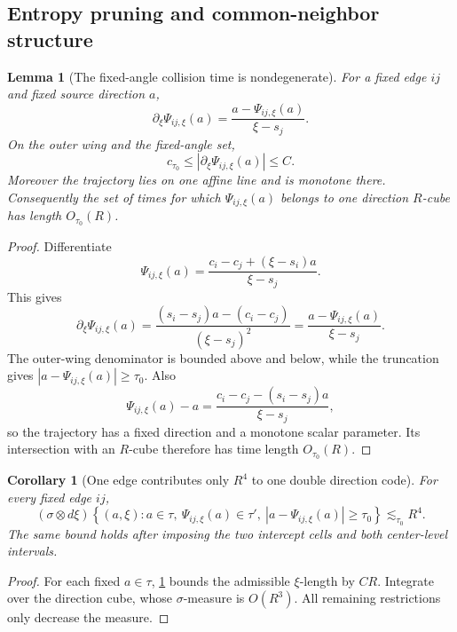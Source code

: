 \documentclass[10pt]{article}
\newtheorem{lemma}[theorem]{Lemma}
\newtheorem{corollary}[theorem]{Corollary}
\begin{document}
\subsection{Entropy pruning and common-neighbor structure}

\begin{lemma}[The fixed-angle collision time is nondegenerate]
\label{lem:v042-time-bilipschitz}
For a fixed edge \(ij\) and fixed source direction \(a\),
\begin{equation}
\label{eq:v042-time-derivative}
\boxed{
\partial_\xi\Psi_{ij,\xi}(a)
=
\frac{
a-\Psi_{ij,\xi}(a)
}{
\xi-s_j
}.
}
\end{equation}
On the outer wing and the fixed-angle set,
\[
c_{\tau_0}
\le
\left|
\partial_\xi\Psi_{ij,\xi}(a)
\right|
\le
C.
\]
Moreover the trajectory lies on one affine line and is monotone there.  Consequently the set of
times for which \(\Psi_{ij,\xi}(a)\) belongs to one direction \(R\)-cube has length \(O_{\tau_0}(R)\).
\end{lemma}

\begin{proof}
Differentiate
\[
\Psi_{ij,\xi}(a)
=
\frac{c_i-c_j+(\xi-s_i)a}{\xi-s_j}.
\]
This gives
\[
\partial_\xi\Psi_{ij,\xi}(a)
=
\frac{(s_i-s_j)a-(c_i-c_j)}{(\xi-s_j)^2}
=
\frac{a-\Psi_{ij,\xi}(a)}{\xi-s_j}.
\]
The outer-wing denominator is bounded above and below, while the truncation gives
\(|a-\Psi_{ij,\xi}(a)|\ge\tau_0\).  Also
\[
\Psi_{ij,\xi}(a)-a
=
\frac{
c_i-c_j-(s_i-s_j)a
}{
\xi-s_j
},
\]
so the trajectory has a fixed direction and a monotone scalar parameter.  Its intersection with
an \(R\)-cube therefore has time length \(O_{\tau_0}(R)\).
\end{proof}

\begin{corollary}[One edge contributes only \(R^4\) to one double direction code]
\label{cor:v042-one-edge-double-code}
For every fixed edge \(ij\),
\begin{equation}
\label{eq:v042-one-edge-double-code}
\boxed{
(\sigma\otimes d\xi)
\left\{
(a,\xi):
a\in\tau,\ 
\Psi_{ij,\xi}(a)\in\tau',\
|a-\Psi_{ij,\xi}(a)|\ge\tau_0
\right\}
\lesssim_{\tau_0}
R^4.
}
\end{equation}
The same bound holds after imposing the two intercept cells and both center-level intervals.
\end{corollary}

\begin{proof}
For each fixed \(a\in\tau\), \cref{lem:v042-time-bilipschitz} bounds the admissible
\(\xi\)-length by \(CR\).  Integrate over the direction cube, whose \(\sigma\)-measure is
\(O(R^3)\).  All remaining restrictions only decrease the measure.
\end{proof}
\end{document}
